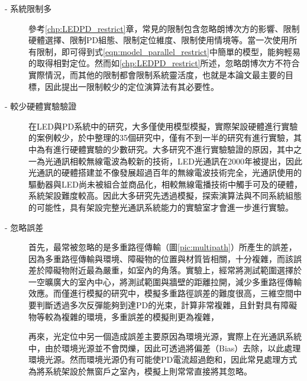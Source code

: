     \begin{description}

        \item[- 系統限制多]\hfill 
        
        \qquad
        參考\ref{chp:LEDPD_restrict}章，常見的限制包含忽略朗博次方的影響、限制硬體選擇、限制PD組態、限制定位維度、限制使用情境等。當一次使用所有限制，即可得到式\ref{eqn:model_parallel_restrict}中簡單的模型，能夠輕易的取得相對定位。然而如\ref{chp:LEDPD_restrict}所述，忽略朗博次方不符合實際情況，而其他的限制都會限制系統靈活度，也就是本論文最主要的目標，因此提出一限制較少的定位演算法有其必要性。
        
        \item[- 較少硬體實驗驗證]\hfill 
        
        \qquad
        在LED與PD系統中的研究，大多僅使用模型模擬，實際架設硬體進行實驗的案例較少，於\cite{survey_light2018}中整理的35個研究中，僅有不到一半的研究有進行實驗，其中\cite{case:hypercube}\cite{case:3d_layers}為有進行硬體實驗的少數研究。大多研究不進行實驗驗證的原因，其中之一為光通訊相較無線電波為較新的技術，LED光通訊在2000年被提出\cite{vlc}，因此光通訊的硬體搭建並不像發展超過百年的無線電波技術完全，光通訊使用的驅動器與LED尚未被組合並商品化\cite{vlc_adv}，相較無線電播技術中觸手可及的硬體，系統架設難度較高。因此大多研究先透過模擬，探索演算法與不同系統組態的可能性，具有架設完整光通訊系統能力的實驗室才會進一步進行實驗。


        \item[- 忽略誤差]\hfill 

        \qquad
        首先，最常被忽略的是多重路徑傳輸（圖\ref{pic:multipath}）所產生的誤差，因為多重路徑傳輸與環境、障礙物的位置與材質皆相關，十分複雜，而該誤差於障礙物附近最為嚴重，如室內的角落。實驗上，經常將測試範圍選擇於一空曠廣大的室內中心，將測試範圍與牆壁的距離拉開，減少多重路徑傳輸效應。而僅進行模擬的研究中，模擬多重路徑誤差的難度很高\cite{multipath}，三維空間中要判斷透過多次反彈能夠到達PD的光束，計算非常複雜，且針對具有障礙物等較為複雜的環境，多重誤差的模擬則更為複雜，

        再來，光定位中另一個造成誤差主要原因為環境光源，實際上在光通訊系統中，由於環境光源並不會閃爍，因此可透過將偏差（Bias）去除，以此處理環境光源。然而環境光源仍有可能使PD電流超過飽和，因此常見處理方式為將系統架設於無窗戶之室內，模擬上則常常直接將其忽略。

    \end{description}






